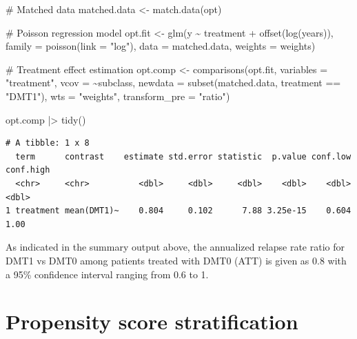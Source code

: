 \documentclass[
  letterpaper,
  DIV=11,
  numbers=noendperiod]{scrreprt}
\newenvironment{Shaded}{\begin{snugshade}}{\end{snugshade}}
\newcommand{\AttributeTok}[1]{\textcolor[rgb]{0.40,0.45,0.13}{#1}}
\newcommand{\CommentTok}[1]{\textcolor[rgb]{0.37,0.37,0.37}{#1}}
\newcommand{\FunctionTok}[1]{\textcolor[rgb]{0.28,0.35,0.67}{#1}}
\newcommand{\NormalTok}[1]{\textcolor[rgb]{0.00,0.23,0.31}{#1}}
\newcommand{\OtherTok}[1]{\textcolor[rgb]{0.00,0.23,0.31}{#1}}
\newcommand{\SpecialCharTok}[1]{\textcolor[rgb]{0.37,0.37,0.37}{#1}}
\newcommand{\StringTok}[1]{\textcolor[rgb]{0.13,0.47,0.30}{#1}}
\begin{document}
\begin{Shaded}
\begin{Highlighting}[]
\CommentTok{\# Matched data}
\NormalTok{matched.data }\OtherTok{\textless{}{-}} \FunctionTok{match.data}\NormalTok{(opt)}

\CommentTok{\# Poisson regression model}
\NormalTok{opt.fit }\OtherTok{\textless{}{-}} \FunctionTok{glm}\NormalTok{(y }\SpecialCharTok{\textasciitilde{}}\NormalTok{ treatment }\SpecialCharTok{+} \FunctionTok{offset}\NormalTok{(}\FunctionTok{log}\NormalTok{(years)), }
            \AttributeTok{family =} \FunctionTok{poisson}\NormalTok{(}\AttributeTok{link =} \StringTok{"log"}\NormalTok{),}
            \AttributeTok{data =}\NormalTok{ matched.data, }
            \AttributeTok{weights =}\NormalTok{ weights)}

\CommentTok{\# Treatment effect estimation}
\NormalTok{opt.comp }\OtherTok{\textless{}{-}} \FunctionTok{comparisons}\NormalTok{(opt.fit,}
                        \AttributeTok{variables =} \StringTok{"treatment"}\NormalTok{,}
                        \AttributeTok{vcov =} \SpecialCharTok{\textasciitilde{}}\NormalTok{subclass,}
                        \AttributeTok{newdata =} \FunctionTok{subset}\NormalTok{(matched.data, treatment }\SpecialCharTok{==} \StringTok{"DMT1"}\NormalTok{),}
                        \AttributeTok{wts =} \StringTok{"weights"}\NormalTok{,}
                        \AttributeTok{transform\_pre =} \StringTok{"ratio"}\NormalTok{)}

\NormalTok{opt.comp }\SpecialCharTok{|\textgreater{}} \FunctionTok{tidy}\NormalTok{()}
\end{Highlighting}
\end{Shaded}

\begin{verbatim}
# A tibble: 1 x 8
  term      contrast    estimate std.error statistic  p.value conf.low conf.high
  <chr>     <chr>          <dbl>     <dbl>     <dbl>    <dbl>    <dbl>     <dbl>
1 treatment mean(DMT1)~    0.804     0.102      7.88 3.25e-15    0.604      1.00
\end{verbatim}

As indicated in the summary output above, the annualized relapse rate
ratio for DMT1 vs DMT0 among patients treated with DMT0 (ATT) is given
as 0.8 with a 95\% confidence interval ranging from 0.6 to 1.

\hypertarget{propensity-score-stratification}{%
\section{Propensity score
stratification}\label{propensity-score-stratification}}
\end{document}
